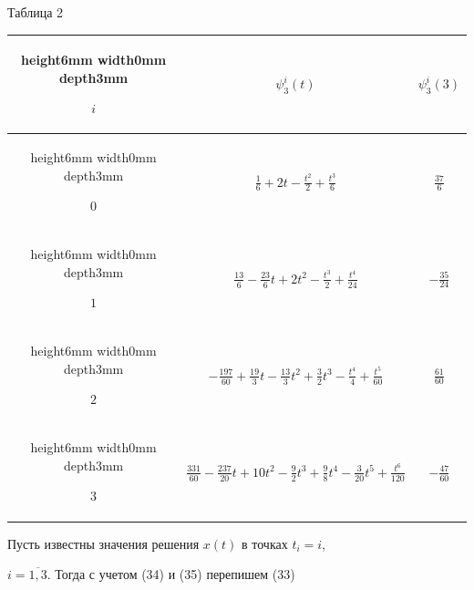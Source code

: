 \begin{exam}
\begin{center}
\hspace{73mm}Таблица 2


\medskip





\begin{tabular}{|c|c|c|}


\hline \vrule height6mm width0mm depth3mm




$i$ & $\psi_3^i(t)$ & $\psi_3^i(3)$ \\


\hline


\hline \vrule height6mm width0mm depth3mm




$0$ & $\frac{1}{6}+2t-\frac{t^2}{2}+\frac{t^3}{6}$


& $\frac{37}{6}$ \\


\hline \vrule height6mm width0mm depth3mm




$1$ & $\frac{13}{6}-\frac{23}{6}t+2t^2-\frac{t^3}{2}+


\frac{t^4}{24}$ & $-\frac{35}{24}$\\


\hline \vrule height6mm width0mm depth3mm




$2$ & $-\frac{197}{60}+\frac{19}{3}t-\frac{13}{3}t^2+


\frac{3}{2}t^3-\frac{t^4}{4}+\frac{t^5}{60}$ & $\frac{61}{60}$\\


\hline \vrule height6mm width0mm depth3mm




$3$ & $\frac{331}{60}-\frac{237}{20}t+10t^2-\frac{9}{2}t^3+


\frac{9}{8}t^4-\frac{3}{20}t^5+\frac{t^6}{120}$ & $-\frac{47}{60}$\\


\hline


\end{tabular}


\end{center}





Пусть известны значения решения $x(t)$ в точках $t_i=i$,


$i=\overline{1,3}$. Тогда с учетом (34) и (35) перепишем (33)



\end{exam}
